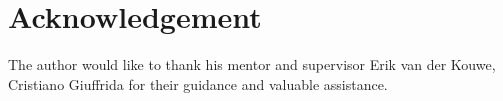 \section*{Acknowledgement}
The author would like to thank his mentor and supervisor Erik van der Kouwe, Cristiano Giuffrida for their guidance and valuable assistance.
